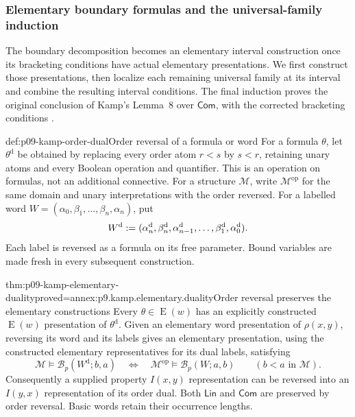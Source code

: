 
\subsubsection{Elementary boundary formulas and the universal-family induction}
\label{sec:p09-kamp-iii2-lemma8-completion}

The boundary decomposition becomes an elementary interval construction once
its bracketing conditions have actual elementary presentations. We first
construct those presentations, then localize each remaining universal family
at its interval and combine the resulting interval conditions. The final
induction proves the original conclusion of Kamp's Lemma~8 over
\(\mathsf{Com}\), with the corrected bracketing conditions
\cite[ch.~III, pp.~85--92]{Kamp1968}.

\begin{hbdefinition}{def:p09-kamp-order-dual}{Order reversal of a formula or word}
For a formula \(\theta\), let \(\theta^{\mathrm d}\) be obtained
by replacing every order atom \(r<s\) by \(s<r\), retaining
unary atoms and every Boolean operation and quantifier. This is an
operation on formulas, not an additional connective. For a structure
\(\mathcal M\), write \(\mathcal M^{\mathrm{op}}\) for the
same domain and unary interpretations with the order reversed.
For a labelled word \(W=(\alpha_0,\beta_1,\ldots,\beta_n,\alpha_n)\),
put
\[
 W^{\mathrm d}\mathrel{:=}
 (\alpha_n^{\mathrm d},\beta_n^{\mathrm d},\alpha_{n-1}^{\mathrm d},
                    \ldots,\beta_1^{\mathrm d},\alpha_0^{\mathrm d}).
\]
Each label is reversed as a formula on its free parameter. Bound variables
are made fresh in every subsequent construction.
\end{hbdefinition}

\begin{hblemma}{thm:p09-kamp-elementary-duality}{proved=annex:p9.kamp.elementary.duality}{Order reversal preserves the elementary constructions}
Every \(\theta\in\operatorname{E}(w)\) has an explicitly
constructed \(\operatorname{E}(w)\) presentation of
\(\theta^{\mathrm d}\). Given an elementary word presentation
of \(\rho(x,y)\), reversing its word and its labels gives an
elementary presentation, using the constructed elementary representatives
for its dual labels, satisfying
\[
 \mathcal M\models\mathcal B_p(W^{\mathrm d};b,a)
 \quad\Longleftrightarrow\quad
 \mathcal M^{\mathrm{op}}\models\mathcal B_p(W;a,b)
 \qquad(b<a\text{ in }\mathcal M).
\]
Consequently a supplied property \(I(x,y)\) representation can be
reversed into an \(I(y,x)\) representation of its order dual.
Both \(\mathsf{Lin}\) and \(\mathsf{Com}\) are preserved
by order reversal. Basic words retain their occurrence lengths.
\end{hblemma}

